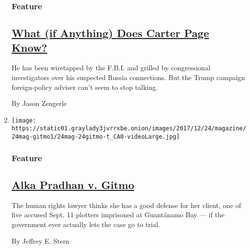 \begin{enumerate}
  \hypertarget{feature-2}{%
  \subsubsection{Feature}\label{feature-2}}

  \hypertarget{what-if-anything-does-carter-page-know}{%
  \subsection{\texorpdfstring{\href{/2017/12/18/magazine/what-if-anything-does-carter-page-know.html}{What
  (if Anything) Does Carter Page
  Know?}}{What (if Anything) Does Carter Page Know?}}\label{what-if-anything-does-carter-page-know}}

  He has been wiretapped by the F.B.I. and grilled by congressional
  investigators over his suspected Russia connections. But the Trump
  campaign foreign-policy adviser can't seem to stop talking.

  By Jason Zengerle
\item
  \texttt{[image: https://static01.graylady3jvrrxbe.onion/images/2017/12/24/magazine/24mag-gitmo1/24mag-24gitmo-t\_CA0-videoLarge.jpg]}

  \hypertarget{feature-3}{%
  \subsubsection{Feature}\label{feature-3}}

  \hypertarget{alka-pradhan-v-gitmo}{%
  \subsection{\texorpdfstring{\href{/2017/12/19/magazine/alka-pradhan-v-gitmo.html}{Alka
  Pradhan v.
  Gitmo}}{Alka Pradhan v. Gitmo}}\label{alka-pradhan-v-gitmo}}

  The human rights lawyer thinks she has a good defense for her client,
  one of five accused Sept. 11 plotters imprisoned at Guantánamo Bay ---
  if the government ever actually lets the case go to trial.

  By Jeffrey E. Stern
\end{enumerate}

